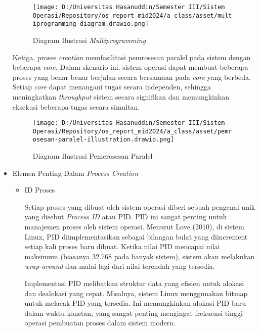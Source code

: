 \documentclass[12pt]{article}
\begin{document}
\begin{itemize}
    \begin{figure}[h]
        \centering
        \texttt{[image: D:/Universitas Hasanuddin/Semester III/Sistem Operasi/Repository/os\_report\_mid2024/a\_class/asset/multiprogramming-diagram.drawio.png]}
        \caption{Diagram Ilustrasi \textit{Multiprogramming}}
    \end{figure}

    Ketiga, proses \textit{creation} memfasilitasi pemrosesan 
    paralel pada sistem dengan beberapa \textit{core}. Dalam 
    skenario ini, sistem operasi dapat membuat beberapa proses 
    yang benar-benar berjalan secara bersamaan pada \textit{core} 
    yang berbeda. Setiap \textit{core} dapat menangani tugas 
    secara independen, sehingga meningkatkan \textit{throughput} sistem 
    secara signifikan dan memungkinkan eksekusi beberapa tugas 
    secara simultan.

    \begin{figure}[h]
        \centering
        \texttt{[image: D:/Universitas Hasanuddin/Semester III/Sistem Operasi/Repository/os\_report\_mid2024/a\_class/asset/pemrosesan-paralel-illustration.drawio.png]}
        \caption{Diagram Ilustrasi Pemerosesan Paralel}
    \end{figure}

    \item Elemen Penting Dalam \textit{Process Creation}
    
    \begin{itemize}
        \item ID Proses
        
        Setiap proses yang dibuat oleh sistem operasi diberi 
        sebuah pengenal unik yang disebut \textit{Process ID} 
        atau PID. PID ini sangat penting untuk manajemen proses 
        oleh sistem operasi. Menurut Love (2010), di sistem 
        Linux, PID diimplementasikan sebagai bilangan bulat yang 
        diincrement setiap kali proses baru dibuat. Ketika nilai 
        PID mencapai nilai maksimum (biasanya 32.768 pada banyak 
        sistem), sistem akan melakukan \textit{wrap-around} dan 
        mulai lagi dari nilai terendah yang tersedia.

        Implementasi PID melibatkan struktur data yang efisien 
        untuk alokasi dan dealokasi yang cepat. Misalnya, sistem 
        Linux menggunakan bitmap untuk melacak PID yang tersedia. 
        Ini memungkinkan alokasi PID baru dalam waktu konstan, 
        yang sangat penting mengingat frekuensi tinggi operasi 
        pembuatan proses dalam sistem modern.


\end{itemize}
\end{itemize}
\end{document}
